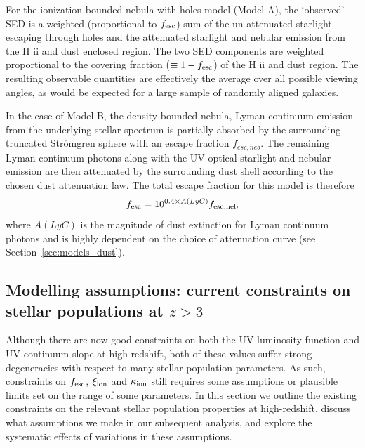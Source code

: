 For the ionization-bounded nebula with holes model (Model A), the `observed' SED is a weighted (proportional to $f_{\rm{esc}}$) sum of the un-attenuated starlight escaping through holes and the attenuated starlight and nebular emission from the H {\sc ii} and dust enclosed region. The two SED components are weighted proportional to the covering fraction ($\equiv 1 - f_{\rm{esc}}$) of the H {\sc ii} and dust region. The resulting observable quantities are effectively the average over all possible viewing angles, as would be expected for a large sample of randomly aligned galaxies.

In the case of Model B, the density bounded nebula, Lyman continuum emission from the underlying stellar spectrum is partially absorbed by the surrounding truncated Str\"{o}mgren sphere with an escape fraction $f_{esc,neb}$. The remaining Lyman continuum photons along with the UV-optical starlight and nebular emission are then attenuated by the surrounding dust shell according to the chosen dust attenuation law. The total escape fraction for this model is therefore
\begin{equation}
f_{\rm{esc}} = 10^{0.4\times A(LyC)}f_{\rm{esc,neb}}
\end{equation}
where $A(LyC)$ is the magnitude of dust extinction for Lyman continuum photons and is highly dependent on the choice of attenuation curve (see Section~\ref{sec:models_dust}).

\subsection{Modelling assumptions: current constraints on stellar populations at $z>3$}\label{sec:assumptions}
Although there are now good constraints on both the UV luminosity function and UV continuum slope at high redshift, both of these values suffer strong degeneracies with respect to many stellar population parameters. As such, constraints on $f_{\rm{esc}}$, $\xi_{\rm{ion}}$ and $\kappa_{\rm{ion}}$ still requires some assumptions or plausible limits set on the range of some parameters. In this section we outline the existing constraints on the relevant stellar population properties at high-redshift, discuss what assumptions we make in our subsequent analysis, and explore the systematic effects of variations in these assumptions.  

